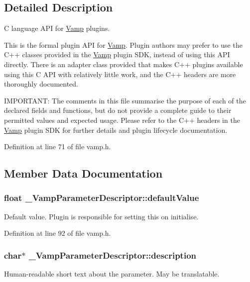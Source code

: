 \subsection{Detailed Description}
C language A\+PI for \hyperlink{namespace_vamp}{Vamp} plugins.

This is the formal plugin A\+PI for \hyperlink{namespace_vamp}{Vamp}. Plugin authors may prefer to use the C++ classes provided in the \hyperlink{namespace_vamp}{Vamp} plugin S\+DK, instead of using this A\+PI directly. There is an adapter class provided that makes C++ plugins available using this C A\+PI with relatively little work, and the C++ headers are more thoroughly documented.

I\+M\+P\+O\+R\+T\+A\+NT\+: The comments in this file summarise the purpose of each of the declared fields and functions, but do not provide a complete guide to their permitted values and expected usage. Please refer to the C++ headers in the \hyperlink{namespace_vamp}{Vamp} plugin S\+DK for further details and plugin lifecycle documentation. 

Definition at line 71 of file vamp.\+h.



\subsection{Member Data Documentation}
\subsubsection[{\texorpdfstring{default\+Value}{defaultValue}}]{\setlength{\rightskip}{0pt plus 5cm}float \+\_\+\+Vamp\+Parameter\+Descriptor\+::default\+Value}\hypertarget{struct___vamp_parameter_descriptor_a3d37f986ee152ab55feb9902b35f7aca}{}\label{struct___vamp_parameter_descriptor_a3d37f986ee152ab55feb9902b35f7aca}
Default value. Plugin is responsible for setting this on initialise. 

Definition at line 92 of file vamp.\+h.

\subsubsection[{\texorpdfstring{description}{description}}]{ char$\ast$ \+\_\+\+Vamp\+Parameter\+Descriptor\+::description}\hypertarget{struct___vamp_parameter_descriptor_a95489272d6cf5a5b487e949da8e4fac6}{}\label{struct___vamp_parameter_descriptor_a95489272d6cf5a5b487e949da8e4fac6}
Human-\/readable short text about the parameter. May be translatable. 

